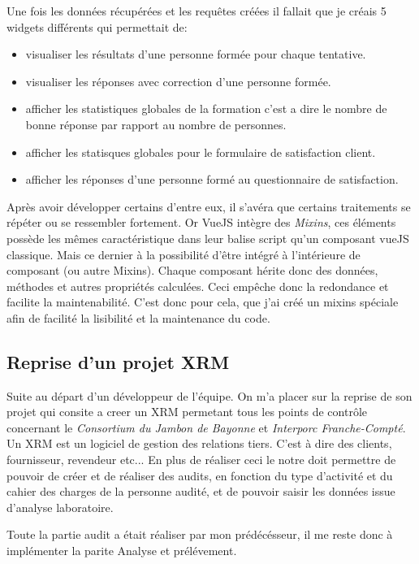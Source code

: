 Une fois les données récupérées et les requêtes créées il fallait que je créais 5 widgets différents qui permettait de: 
\begin{itemize}
    \item visualiser les résultats d'une personne formée pour chaque tentative. 
    \item  visualiser les réponses avec correction d'une personne formée.
    \item afficher les statistiques globales de la formation c'est a dire le nombre de bonne réponse par rapport au nombre de personnes.
    \item afficher les statisques globales pour le formulaire de satisfaction client. 
    \item afficher les réponses d'une personne formé au questionnaire de satisfaction.  
\end{itemize}

Après avoir développer certains d'entre eux, il s'avéra que certains traitements se répéter ou se ressembler fortement. Or VueJS intègre des \textit{Mixins}, ces éléments possède les mêmes caractéristique dans leur balise script qu'un composant vueJS classique. Mais ce dernier à la possibilité d'être intégré à l'intérieure de composant (ou autre Mixins). Chaque composant hérite donc des données, méthodes et autres propriétés calculées. Ceci empêche donc la redondance et facilite la maintenabilité.
C'est donc pour cela, que j'ai créé un mixins spéciale afin de facilité la lisibilité et la maintenance du code. 


\subsection{Reprise d'un projet XRM}
Suite au départ d'un développeur de l'équipe. On m'a placer sur la reprise de son projet qui consite a creer un XRM permetant tous les points de contrôle concernant le \textit{Consortium du Jambon de Bayonne} et \textit{Interporc Franche-Compté}.
Un XRM est un logiciel de gestion des relations tiers. C'est à dire des clients, fournisseur, revendeur etc... En plus de réaliser ceci le notre doit permettre de pouvoir de créer et de réaliser des audits, en fonction du type d'activité et du cahier des charges de la personne audité, et de pouvoir saisir les données issue d'analyse laboratoire.

Toute la partie audit a était réaliser par mon prédécésseur, il me reste donc à implémenter la parite Analyse et prélévement. 

